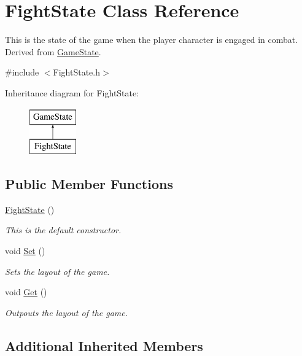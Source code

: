 \hypertarget{classFightState}{\section{Fight\-State Class Reference}
\label{classFightState}
}


This is the state of the game when the player character is engaged in combat. Derived from \hyperlink{classGameState}{Game\-State}.  




{\ttfamily \#include $<$Fight\-State.\-h$>$}

Inheritance diagram for Fight\-State\-:\begin{figure}[H]
\begin{center}
\leavevmode
\includegraphics[height=2.000000cm]{classFightState}
\end{center}
\end{figure}
\subsection*{Public Member Functions}
\begin{DoxyCompactItemize}
\item 
\hyperlink{classFightState_afe4bbc2ba8a3aac74abca651bf23e91d}{Fight\-State} ()
\begin{DoxyCompactList}\small\item\em This is the default constructor. \end{DoxyCompactList}\item 
void \hyperlink{classFightState_a853f6d2a9caf7343b8d75165e44bf5c1}{Set} ()
\begin{DoxyCompactList}\small\item\em Sets the layout of the game. \end{DoxyCompactList}\item 
void \hyperlink{classFightState_afeff88d0e0c0fa25049e2152190429ed}{Get} ()
\begin{DoxyCompactList}\small\item\em Outpouts the layout of the game. \end{DoxyCompactList}\end{DoxyCompactItemize}
\subsection*{Additional Inherited Members}


